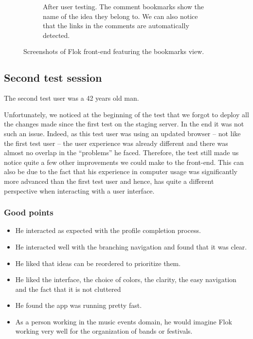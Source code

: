 \documentclass[a4paper,12pt,twoside]{article}
\begin{document}
\begin{figure}[!htb]
\begin{subfigure}[t]{.495\textwidth}
        \caption{After user testing. The comment bookmarks show the name of the idea they belong to. We can also notice that the links in the comments are automatically detected.}
        \label{fig.tests.bookmarks.after}
    \end{subfigure}
    \caption{Screenshots of Flok front-end featuring the bookmarks view.}
    \label{fig.tests.bookmarks}
\end{figure}

\FloatBarrier
\subsection{Second test session}
The second test user was a 42 years old man.

Unfortunately, we noticed at the beginning of the test that we forgot to deploy all the changes made since the first test on the staging server.
In the end it was not such an issue.
Indeed, as this test user was using an updated browser – not like the first test user – the user experience was already different and there was almost no overlap in the “problems” he faced.
Therefore, the test still made us notice quite a few other improvements we could make to the front-end.
This can also be due to the fact that his experience in computer usage was significantly more advanced than the first test user and hence, has quite a different perspective when interacting with a user interface.

\subsubsection*{Good points}
\begin{itemize}
    \item He interacted as expected with the profile completion process.
    \item He interacted well with the branching navigation and found that it was clear.
    \item He liked that ideas can be reordered to prioritize them.
    \item He liked the interface, the choice of colors, the clarity, the easy navigation and the fact that it is not cluttered
    \item He found the app was running pretty fast.
    \item As a person working in the music events domain, he would imagine Flok working very well for the organization of bands or festivals.
\end{itemize}
\end{document}

